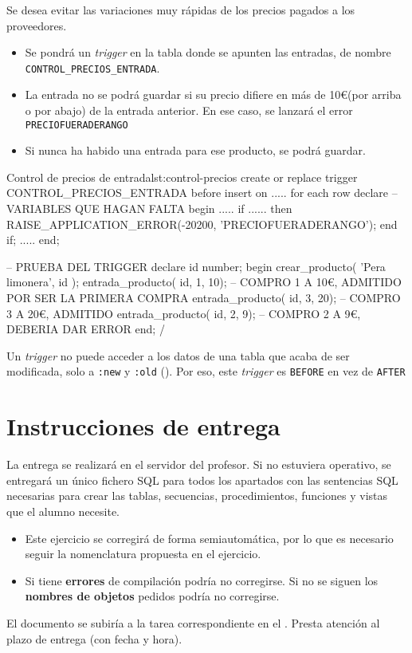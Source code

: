 \begin{homeworkProblem}

  Se desea evitar las variaciones muy rápidas de los precios pagados a los proveedores.
  \begin{itemize}
  \item Se pondrá un \textit{trigger} en la tabla donde se apunten las entradas, de nombre \texttt{CONTROL\_PRECIOS\_ENTRADA}.
  \item La entrada  no se podrá guardar si su precio difiere en más de 10\euro (por arriba o por abajo) de la entrada anterior. En ese caso, se lanzará el error \texttt{PRECIOFUERADERANGO}
  \item Si nunca ha habido una entrada para ese producto, se podrá guardar.
  \end{itemize}

\begin{listadosql}{Control de precios de entrada}{lst:control-precios}
create or replace trigger CONTROL_PRECIOS_ENTRADA
before insert on .....
for each row 
declare
-- VARIABLES QUE HAGAN FALTA
begin
.....
if ...... then
RAISE_APPLICATION_ERROR(-20200, 'PRECIOFUERADERANGO');
end if;
.....
end;

-- PRUEBA DEL TRIGGER
declare
id number;
begin
crear_producto( 'Pera limonera', id );
entrada_producto( id, 1, 10); -- COMPRO 1 A 10€, ADMITIDO POR SER LA PRIMERA COMPRA
entrada_producto( id, 3, 20); -- COMPRO 3 A 20€, ADMITIDO
entrada_producto( id, 2, 9); -- COMPRO 2 A 9€, DEBERIA DAR ERROR
end;
/
\end{listadosql}  

  \begin{Aviso}
    Un \textit{trigger} no puede acceder a los datos de una tabla que acaba de ser modificada, solo a \texttt{:new} y \texttt{:old} (). Por eso, este \textit{trigger} es \texttt{BEFORE} en vez de \texttt{AFTER}
  \end{Aviso}


\end{homeworkProblem}



\section{Instrucciones de entrega}
La entrega se realizará en el servidor del profesor. Si no estuviera operativo, se entregará un único fichero SQL para todos los apartados con las sentencias SQL necesarias para crear las tablas, secuencias, procedimientos, funciones y vistas que el alumno necesite.
\begin{itemize}
\item Este ejercicio se corregirá de forma semiautomática, por lo que es necesario seguir la nomenclatura propuesta en el ejercicio.
\item Si tiene \textbf{errores} de compilación podría no corregirse. Si no se siguen los \textbf{nombres de objetos} pedidos podría no corregirse.
\end{itemize}


El documento se subiría a la tarea correspondiente en el .
Presta atención al plazo de entrega (con fecha y hora).







